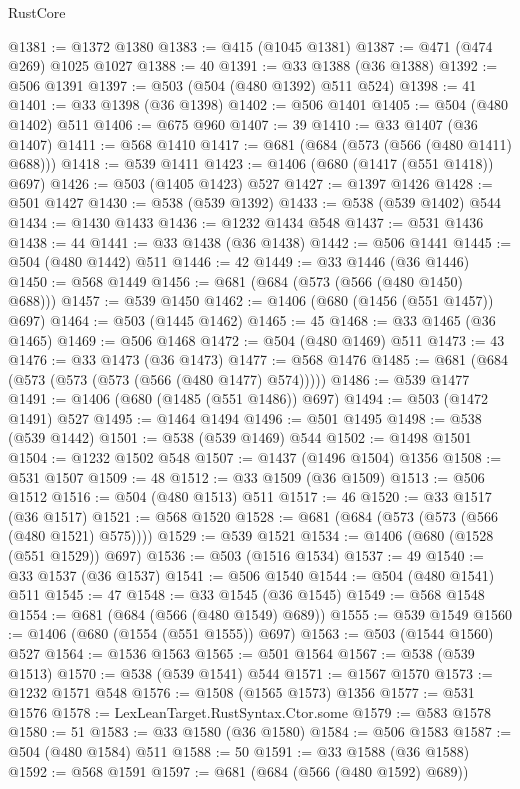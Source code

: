 \begin{lexlean}{RustCore}
\begin{coremodule}
@1381 := @1372 @1380
@1383 := @415 (@1045 @1381)
@1387 := @471 (@474 @269) @1025 @1027
@1388 := 40
@1391 := @33 @1388 (@36 @1388)
@1392 := @506 @1391
@1397 := @503 (@504 (@480 @1392) @511 @524)
@1398 := 41
@1401 := @33 @1398 (@36 @1398)
@1402 := @506 @1401
@1405 := @504 (@480 @1402) @511
@1406 := @675 @960
@1407 := 39
@1410 := @33 @1407 (@36 @1407)
@1411 := @568 @1410
@1417 := @681 (@684 (@573 (@566 (@480 @1411) @688)))
@1418 := @539 @1411
@1423 := @1406 (@680 (@1417 (@551 @1418)) @697)
@1426 := @503 (@1405 @1423) @527
@1427 := @1397 @1426
@1428 := @501 @1427
@1430 := @538 (@539 @1392)
@1433 := @538 (@539 @1402) @544
@1434 := @1430 @1433
@1436 := @1232 @1434 @548
@1437 := @531 @1436
@1438 := 44
@1441 := @33 @1438 (@36 @1438)
@1442 := @506 @1441
@1445 := @504 (@480 @1442) @511
@1446 := 42
@1449 := @33 @1446 (@36 @1446)
@1450 := @568 @1449
@1456 := @681 (@684 (@573 (@566 (@480 @1450) @688)))
@1457 := @539 @1450
@1462 := @1406 (@680 (@1456 (@551 @1457)) @697)
@1464 := @503 (@1445 @1462)
@1465 := 45
@1468 := @33 @1465 (@36 @1465)
@1469 := @506 @1468
@1472 := @504 (@480 @1469) @511
@1473 := 43
@1476 := @33 @1473 (@36 @1473)
@1477 := @568 @1476
@1485 := @681 (@684 (@573 (@573 (@573 (@566 (@480 @1477) @574)))))
@1486 := @539 @1477
@1491 := @1406 (@680 (@1485 (@551 @1486)) @697)
@1494 := @503 (@1472 @1491) @527
@1495 := @1464 @1494
@1496 := @501 @1495
@1498 := @538 (@539 @1442)
@1501 := @538 (@539 @1469) @544
@1502 := @1498 @1501
@1504 := @1232 @1502 @548
@1507 := @1437 (@1496 @1504) @1356
@1508 := @531 @1507
@1509 := 48
@1512 := @33 @1509 (@36 @1509)
@1513 := @506 @1512
@1516 := @504 (@480 @1513) @511
@1517 := 46
@1520 := @33 @1517 (@36 @1517)
@1521 := @568 @1520
@1528 := @681 (@684 (@573 (@573 (@566 (@480 @1521) @575))))
@1529 := @539 @1521
@1534 := @1406 (@680 (@1528 (@551 @1529)) @697)
@1536 := @503 (@1516 @1534)
@1537 := 49
@1540 := @33 @1537 (@36 @1537)
@1541 := @506 @1540
@1544 := @504 (@480 @1541) @511
@1545 := 47
@1548 := @33 @1545 (@36 @1545)
@1549 := @568 @1548
@1554 := @681 (@684 (@566 (@480 @1549) @689))
@1555 := @539 @1549
@1560 := @1406 (@680 (@1554 (@551 @1555)) @697)
@1563 := @503 (@1544 @1560) @527
@1564 := @1536 @1563
@1565 := @501 @1564
@1567 := @538 (@539 @1513)
@1570 := @538 (@539 @1541) @544
@1571 := @1567 @1570
@1573 := @1232 @1571 @548
@1576 := @1508 (@1565 @1573) @1356
@1577 := @531 @1576
@1578 := LexLeanTarget.RustSyntax.Ctor.some
@1579 := @583 @1578
@1580 := 51
@1583 := @33 @1580 (@36 @1580)
@1584 := @506 @1583
@1587 := @504 (@480 @1584) @511
@1588 := 50
@1591 := @33 @1588 (@36 @1588)
@1592 := @568 @1591
@1597 := @681 (@684 (@566 (@480 @1592) @689))

\end{coremodule}
\end{lexlean}
